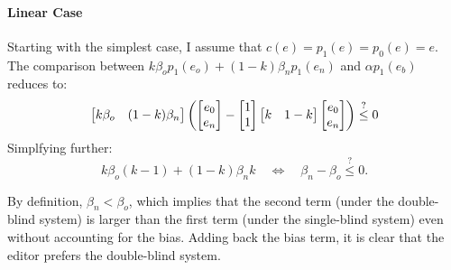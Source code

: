 \documentclass[12pt]{article}
\begin{document}
\paragraph{Linear Case}
Starting with the simplest case, I assume that $c(e) = p_1(e) = p_0(e) = e$.
The comparison between $k \beta_o p_1(e_o) + (1 - k) \beta_n p_1(e_n)$ and
$\alpha p_1(e_b)$ reduces to:
\begin{equation*}
    \begin{bmatrix}
        k\beta_o & (1-k)\beta_n
    \end{bmatrix}
    \left(
        \begin{bmatrix}
            e_0 \\ e_n
        \end{bmatrix}
        -
        \begin{bmatrix}
            1 \\ 1
        \end{bmatrix}
        \begin{bmatrix}
            k & 1-k
        \end{bmatrix}
        \begin{bmatrix}
            e_0 \\ e_n
        \end{bmatrix}\right)
    \stackrel{?}{\leq} 0
\end{equation*}
Simplfying further:
\begin{equation*}
    k \beta_o (k - 1) + (1 - k) \beta_n k \quad \Leftrightarrow \quad \beta_n - \beta_o \stackrel{?}{\leq} 0.
\end{equation*}

By definition, $\beta_n < \beta_o$, which implies that the second term (under
the double-blind system) is larger than the first term (under the single-blind
system) even without accounting for the bias. Adding back the bias term, it is
clear that the editor prefers the double-blind system.
\end{document}
